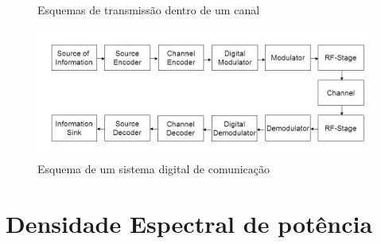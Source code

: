 \documentclass[12pt]{book}
\begin{document}
\begin{center}
	\begin{figure}[!ht]
        \caption{Esquemas de transmissão dentro de um canal}
	\end{figure}
	\begin{figure}[!ht]
		\includegraphics[scale=0.5]{figuras_cap_1/fig2.jpg}
	    \caption{Esquema de um sistema digital de comunicação}
	\end{figure}
	
\end{center}

\chapter{Densidade Espectral de potência}
\end{document}
